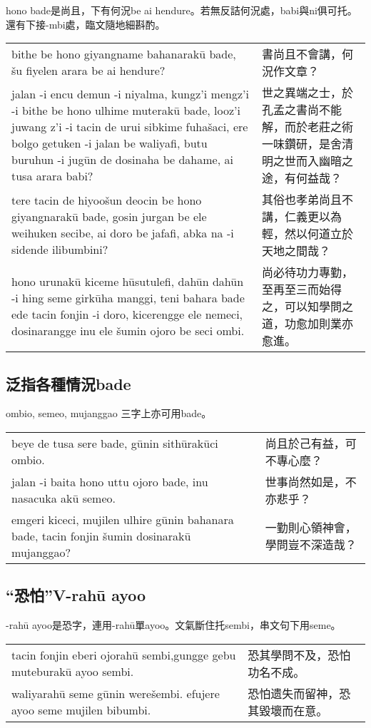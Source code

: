 \documentclass{article}
\begin{document}
\noindent hono bade是尚且，下有何況be ai hendure。若無反詰何況處，babi與ni俱可托。還有下接-mbi處，臨文隨地細斟酌。
\begin{center}
    \begin{tabularx}{\textwidth}{XX}
     bithe be hono giyangname bahanarak\={u} bade, \v{s}u fiyelen arara be ai hendure?&書尚且不會講，何況作文章？\\
     jalan -i encu demun -i niyalma, kungz'i mengz'i -i bithe be hono ulhime muterak\={u} bade, looz'i juwang z'i -i tacin de urui sibkime fuha\v{s}aci, ere bolgo getuken -i jalan be waliyafi, butu buruhun -i jug\={u}n de dosinaha be dahame, ai tusa arara babi?&世之異端之士，於孔孟之書尚不能解，而於老莊之術一味鑽研，是舍清明之世而入幽暗之途，有何益哉？\\
     tere tacin de hiyoo\v{s}un deocin be hono giyangnarak\={u} bade, gosin jurgan be ele weihuken secibe, ai doro be jafafi, abka na -i sidende ilibumbini?&
    其俗也孝弟尚且不講，仁義更以為輕，然以何道立於天地之間哉？\\
     hono urunak\={u} kiceme h\={u}sutulefi, dah\={u}n dah\={u}n -i hing seme girk\={u}ha manggi, teni bahara bade ede tacin fonjin -i doro, kicerengge ele nemeci, dosinarangge inu ele \v{s}umin ojoro be seci ombi.&
    尚必待功力專勤，至再至三而始得之，可以知學問之道，功愈加則業亦愈進。
    \end{tabularx}
\end{center}

\subsection{泛指各種情況bade}
\noindent ombio, semeo, mujanggao 三字上亦可用bade。
\begin{center}
    \begin{tabularx}{\textwidth}{XX}
     beye de tusa sere bade, g\={u}nin sith\={u}rak\={u}ci ombio.&尚且於己有益，可不專心麼？\\
     jalan -i baita hono uttu ojoro bade, inu nasacuka ak\={u} semeo.&世事尚然如是，不亦悲乎？\\
     emgeri kiceci, mujilen ulhire g\={u}nin bahanara bade, tacin fonjin \v{s}umin dosinarak\={u} mujanggao?&一勤則心領神會，學問豈不深造哉？
    \end{tabularx}
\end{center}

\subsection{“恐怕”V-rah\={u} ayoo}
\noindent -rah\={u} ayoo是恐字，連用-rah\={u}單ayoo。文氣斷住托sembi，串文句下用seme。
\begin{center}
    \begin{tabularx}{\textwidth}{XX}
     tacin fonjin eberi ojorah\={u} sembi,gungge gebu muteburak\={u} ayoo sembi.&恐其學問不及，恐怕功名不成。\\
     waliyarah\={u} seme g\={u}nin were\v{s}embi. efujere ayoo seme mujilen bibumbi.& 恐怕遗失而留神，恐其毀壞而在意。
    \end{tabularx}
\end{center}
\end{document}
